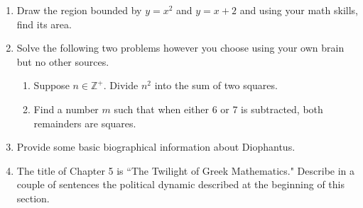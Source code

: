 \documentclass[12pt]{article}
\begin{document}
\begin{enumerate}
\item Draw the region bounded by $y=x^2$ and $y=x+2$ and using your math skills, find its area.
\vfill
\item Solve the following two problems however you choose using your own brain but no other sources.
	\begin{enumerate}
	\item Suppose $n \in \mathbb{Z}^+. $ Divide $n^2$ into the sum of two squares. 
	\vfill
	\item Find a number $m$ such that when either 6 or 7 is subtracted, both remainders are squares.
	\vfill
	\end{enumerate}
\item Provide some basic biographical information about Diophantus.
\vfill
\item The title of Chapter 5 is ``The Twilight of Greek Mathematics." Describe in a couple of sentences the political dynamic described at the beginning of this section.
\vfill
\end{enumerate}
\end{document}
